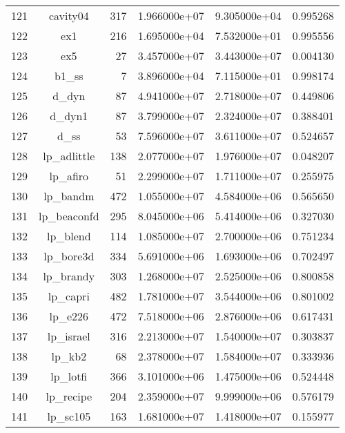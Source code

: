 \documentclass[8pt]{report}
\begin{document}
\begin{table*}
\begin{tabular}{|l|c|r|r|r|r|}
121 &                 cavity04 &   317 &  1.966000e+07 &  9.305000e+04 &  0.995268 \\
122 &                      ex1 &   216 &  1.695000e+04 &  7.532000e+01 &  0.995556 \\
123 &                      ex5 &    27 &  3.457000e+07 &  3.443000e+07 &  0.004130 \\
124 &                    b1\_ss &     7 &  3.896000e+04 &  7.115000e+01 &  0.998174 \\
125 &                    d\_dyn &    87 &  4.941000e+07 &  2.718000e+07 &  0.449806 \\
126 &                   d\_dyn1 &    87 &  3.799000e+07 &  2.324000e+07 &  0.388401 \\
127 &                     d\_ss &    53 &  7.596000e+07 &  3.611000e+07 &  0.524657 \\
128 &              lp\_adlittle &   138 &  2.077000e+07 &  1.976000e+07 &  0.048207 \\
129 &                 lp\_afiro &    51 &  2.299000e+07 &  1.711000e+07 &  0.255975 \\
130 &                 lp\_bandm &   472 &  1.055000e+07 &  4.584000e+06 &  0.565650 \\
131 &              lp\_beaconfd &   295 &  8.045000e+06 &  5.414000e+06 &  0.327030 \\
132 &                 lp\_blend &   114 &  1.085000e+07 &  2.700000e+06 &  0.751234 \\
133 &                lp\_bore3d &   334 &  5.691000e+06 &  1.693000e+06 &  0.702497 \\
134 &                lp\_brandy &   303 &  1.268000e+07 &  2.525000e+06 &  0.800858 \\
135 &                 lp\_capri &   482 &  1.781000e+07 &  3.544000e+06 &  0.801002 \\
136 &                  lp\_e226 &   472 &  7.518000e+06 &  2.876000e+06 &  0.617431 \\
137 &                lp\_israel &   316 &  2.213000e+07 &  1.540000e+07 &  0.303837 \\
138 &                   lp\_kb2 &    68 &  2.378000e+07 &  1.584000e+07 &  0.333936 \\
139 &                 lp\_lotfi &   366 &  3.101000e+06 &  1.475000e+06 &  0.524448 \\
140 &                lp\_recipe &   204 &  2.359000e+07 &  9.999000e+06 &  0.576179 \\
141 &                 lp\_sc105 &   163 &  1.681000e+07 &  1.418000e+07 &  0.155977 \\

\end{tabular}
\end{table*}
\end{document}
